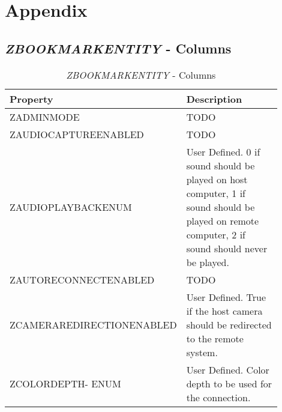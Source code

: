 \documentclass[journal]{IEEEtran}
\begin{document}
\onecolumn
\section{Appendix}

\subsection{\textit{ZBOOKMARKENTITY} - Columns}

\begin{table}[h!]
\caption{\textit{ZBOOKMARKENTITY} - Columns}
\begin{tabular}{p{0.3\linewidth} | p{0.6\linewidth}}
Property                      & Description                                                                                                                                                                                    \\ \hline
ZADMINMODE                    & TODO                                                                                                                                                                                           \\
ZAUDIOCAPTUREENABLED          & TODO                                                                                                                                                                                           \\
ZAUDIOPLAYBACKENUM            & User Defined. 0 if sound should be played on host computer, 1 if sound should be played on remote computer, 2 if sound should never be played.                                                                                                                                                                                           \\
ZAUTORECONNECTENABLED         & TODO                                                                                                                                                                                           \\
ZCAMERAREDIRECTIONENABLED     & User Defined. True if the host camera should be redirected to the remote system.                                                                                                               \\
ZCOLORDEPTH- ENUM               & User Defined. Color depth to be used for the connection.                                                                                                                                       \\

\end{tabular}
\end{table}
\end{document}
